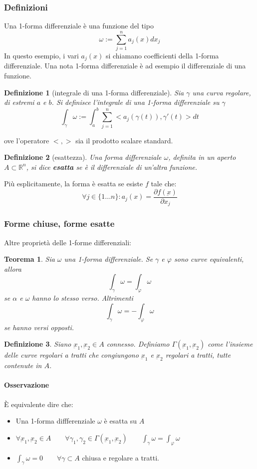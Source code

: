 \documentclass[a4paper,12pt]{article}
\newtheorem{teo}{Teorema}
\newtheorem{defi}{Definizione}
\begin{document}
\subsubsection{Definizioni}
Una 1-forma differenziale è una funzione del tipo
$$\omega := \sum_{j=1}^n a_j(x)dx_j$$
In questo esempio, i vari $a_j(x)$ si chiamano coefficienti della 1-forma differenziale.
Una nota 1-forma differenziale è ad esempio il differenziale di una funzione.
\begin{defi}[integrale di una 1-forma differenziale]
Sia $\gamma$ una curva regolare, di estremi $a$ e $b$.
Si definisce l'integrale di una 1-forma differenziale su $\gamma$
$$\int_\gamma \omega:=\int_a^b \sum_{j=1}^n <a_j(\gamma(t)), \gamma'(t)> dt$$
\end{defi}
ove l'operatore $<,>$ sia il prodotto scalare standard.

\begin{defi}[esattezza]
Una forma differenziale $\omega$, definita in un aperto $A\subset\mathbb{R}^n$, si dice \textbf{esatta} se è il differenziale di un'altra funzione.
\end{defi}
Più esplicitamente, la forma è esatta se esiste $f$ tale che:
$$\forall j\in\{1 ... n\}: a_j(x) = \frac{\partial f(\underbar{x})}{\partial x_j}$$

\subsubsection{Forme chiuse, forme esatte}
Altre proprietà delle 1-forme differenziali:
\begin{teo}
 Sia $\omega$ una 1-forma differenziale. Se $\gamma$ e $\varphi$ sono curve equivalenti, allora
 $$\int_\gamma \omega = \int_\varphi \omega$$
 se $\alpha$ e $\omega$ hanno lo stesso verso. Altrimenti
 $$\int_\gamma \omega = -\int_\varphi \omega$$
 se hanno versi opposti.
\end{teo}

\begin{defi}
 Siano $\underbar{x}_1, \underbar{x}_2\in A$ connesso.
 Definiamo $\Gamma(\underbar{x}_1, \underbar{x}_2)$ come l'insieme delle curve regolari a tratti che congiungono $\underbar{x}_1$ e $\underbar{x}_2$ regolari a tratti, tutte contenute in $A$.
\end{defi}

\paragraph{Osservazione}
È equivalente dire che:
\begin{itemize}
 \item Una 1-forma diffferenziale $\omega$ è esatta su $A$
 \item $\forall \underbar{x}_1, \underbar{x}_2 \in A\qquad \forall\gamma_1,\gamma_2\in\Gamma(\underbar{x}_1, \underbar{x}_2)\qquad \int_\gamma \omega = \int_\varphi \omega$
 \item $\int_\gamma \omega = 0\qquad\forall\gamma\subset A$ chiusa e regolare a tratti.
\end{itemize}
\end{document}
